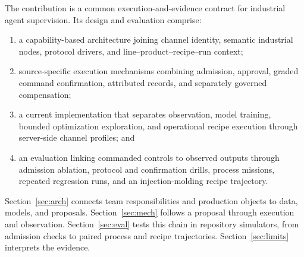 The contribution is a common execution-and-evidence contract for industrial
agent supervision. Its design and evaluation comprise:
\begin{enumerate}
\item a capability-based architecture joining channel identity, semantic
industrial nodes, protocol drivers, and line--product--recipe--run context;
\item source-specific execution mechanisms combining admission, approval,
graded command confirmation, attributed records, and separately governed
compensation;
\item a current implementation that separates observation, model training,
bounded optimization exploration, and operational recipe execution through
server-side channel profiles; and
\item an evaluation linking commanded controls to observed outputs through
admission ablation, protocol and confirmation drills, process missions,
repeated regression runs, and an injection-molding recipe trajectory.
\end{enumerate}

Section~\ref{sec:arch} connects team responsibilities and production objects
to data, models, and proposals. Section~\ref{sec:mech} follows a proposal
through execution and observation. Section~\ref{sec:eval} tests this chain
in repository simulators, from admission checks to paired process and
recipe trajectories. Section~\ref{sec:limits} interprets the evidence.
